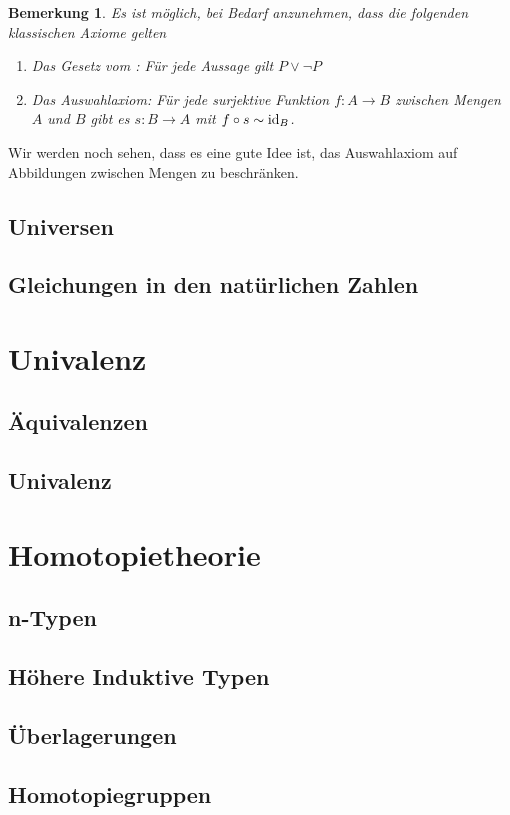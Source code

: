 \documentclass[a4paper,12pt]{article}
\theoremstyle{break}
\newtheorem{bemerkung}[theorem]{Bemerkung}
\theoremstyle{nonumberbreak}
\theoremstyle{nonumberplain}
\begin{document}
\begin{bemerkung}
  Es ist möglich, bei Bedarf anzunehmen, dass die folgenden klassischen Axiome gelten
  \begin{enumerate}
  \item Das Gesetz vom : Für jede Aussage gilt $P\vee \neg P$
  \item Das Auswahlaxiom: Für jede surjektive Funktion $f:A\to B$ zwischen Mengen $A$ und $B$ gibt es $s:B\to A$ mit $f\circ s\sim \mathrm{id}_B$.
  \end{enumerate}
\end{bemerkung}
Wir werden noch sehen, dass es eine gute Idee ist, das Auswahlaxiom auf Abbildungen zwischen Mengen zu beschränken.
\subsection{Universen}

\subsection{Gleichungen in den natürlichen Zahlen}

\section{Univalenz}
\subsection{Äquivalenzen}
\subsection{Univalenz}

\section{Homotopietheorie}
\subsection{n-Typen}
\subsection{Höhere Induktive Typen}
\subsection{Überlagerungen}
\subsection{Homotopiegruppen}

\printindex
\end{document}
